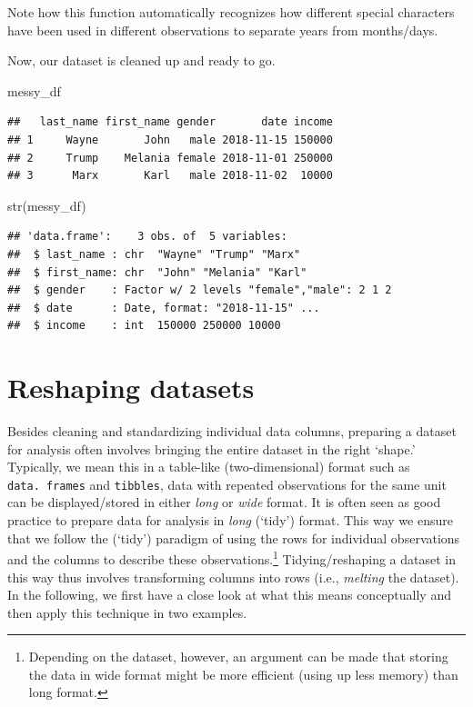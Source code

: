 \documentclass[
  12pt,
]{style/krantz}
\newenvironment{Shaded}{\begin{snugshade}}{\end{snugshade}}
\newcommand{\FunctionTok}[1]{\textcolor[rgb]{0.00,0.00,0.00}{#1}}
\newcommand{\NormalTok}[1]{#1}
\begin{document}
Note how this function automatically recognizes how different special characters have been used in different observations to separate years from months/days.

Now, our dataset is cleaned up and ready to go.

\begin{Shaded}
\begin{Highlighting}[]
\NormalTok{messy\_df}
\end{Highlighting}
\end{Shaded}

\begin{verbatim}
##   last_name first_name gender       date income
## 1     Wayne       John   male 2018-11-15 150000
## 2     Trump    Melania female 2018-11-01 250000
## 3      Marx       Karl   male 2018-11-02  10000
\end{verbatim}

\begin{Shaded}
\begin{Highlighting}[]
\FunctionTok{str}\NormalTok{(messy\_df)}
\end{Highlighting}
\end{Shaded}

\begin{verbatim}
## 'data.frame':    3 obs. of  5 variables:
##  $ last_name : chr  "Wayne" "Trump" "Marx"
##  $ first_name: chr  "John" "Melania" "Karl"
##  $ gender    : Factor w/ 2 levels "female","male": 2 1 2
##  $ date      : Date, format: "2018-11-15" ...
##  $ income    : int  150000 250000 10000
\end{verbatim}

\hypertarget{reshaping-datasets}{%
\section{Reshaping datasets}\label{reshaping-datasets}}

Besides cleaning and standardizing individual data columns, preparing a dataset for analysis often involves bringing the entire dataset in the right `shape.' Typically, we mean this in a table-like (two-dimensional) format such as \texttt{data.\ frames} and \texttt{tibbles}, data with repeated observations for the same unit can be displayed/stored in either \emph{long} or \emph{wide} format. It is often seen as good practice to prepare data for analysis in \emph{long} (`tidy') format. This way we ensure that we follow the (`tidy') paradigm of using the rows for individual observations and the columns to describe these observations.\footnote{Depending on the dataset, however, an argument can be made that storing the data in wide format might be more efficient (using up less memory) than long format.} Tidying/reshaping a dataset in this way thus involves transforming columns into rows (i.e., \emph{melting} the dataset). In the following, we first have a close look at what this means conceptually and then apply this technique in two examples.
\end{document}
